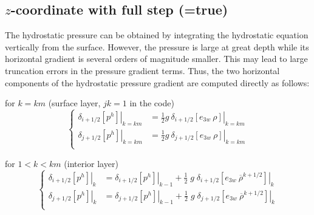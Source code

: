 \documentclass[NEMO_book]{subfiles}
\begin{document}
\subsection   [$z$-coordinate with full step (\np{ln\_dynhpg\_zco}) ]
			{$z$-coordinate with full step (=true)}
\label{DYN_hpg_zco}

The hydrostatic pressure can be obtained by integrating the hydrostatic equation 
vertically from the surface. However, the pressure is large at great depth while its 
horizontal gradient is several orders of magnitude smaller. This may lead to large 
truncation errors in the pressure gradient terms. Thus, the two horizontal components 
of the hydrostatic pressure gradient are computed directly as follows:

for $k=km$ (surface layer, $jk=1$ in the code)
\begin{equation} \label{Eq_dynhpg_zco_surf}
\left\{ \begin{aligned}
					\left. \delta _{i+1/2} \left[  p^h 			 \right] \right|_{k=km} 
&= \frac{1}{2} g \ 	\left. \delta _{i+1/2} \left[  e_{3w} \ \rho \right] \right|_{k=km}   \\
     					\left. \delta _{j+1/2} \left[  p^h  			 \right] \right|_{k=km} 
&= \frac{1}{2} g \ 	\left. \delta _{j+1/2} \left[  e_{3w} \ \rho \right] \right|_{k=km}   \\
\end{aligned} \right.
\end{equation} 

for $1<k<km$ (interior layer)
\begin{equation} \label{Eq_dynhpg_zco}
\left\{ \begin{aligned}
					\left. \delta _{i+1/2} \left[  p^h 			 \right] \right|_{k} 
&=					\left. \delta _{i+1/2} \left[  p^h 			 \right] \right|_{k-1} 
+    \frac{1}{2}\;g\;	\left. \delta _{i+1/2} \left[  e_{3w} \ \overline {\rho}^{k+1/2} \right] \right|_{k}   \\
     					\left. \delta _{j+1/2} \left[  p^h  			 \right] \right|_{k} 
&=     				\left. \delta _{j+1/2} \left[  p^h  			 \right] \right|_{k-1} 
+    \frac{1}{2}\;g\;	\left. \delta _{j+1/2} \left[  e_{3w} \ \overline {\rho}^{k+1/2} \right] \right|_{k}   \\
\end{aligned} \right.
\end{equation} 
\end{document}
